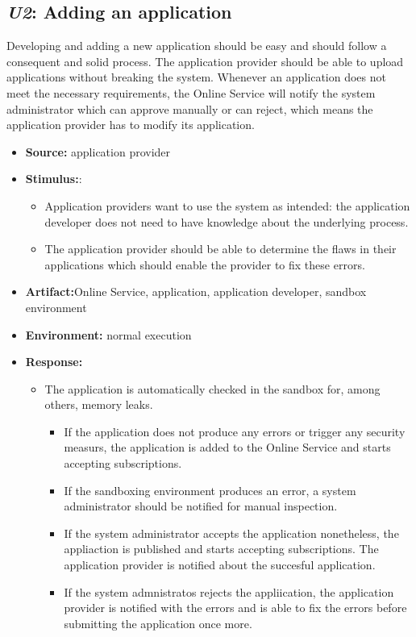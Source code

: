 \documentclass[english]{sareport}
\begin{document}
\subsection{\emph{U2}: Adding an application}
Developing and adding a new application should be easy and should follow a consequent and solid process. The application provider should be able to upload applications without breaking the system. Whenever an application does not meet the necessary requirements, the Online Service will notify the system administrator which can approve manually or can reject, which means the application provider has to modify its application.

\begin{itemize}
    \item \textbf{Source:} application provider
    \item \textbf{Stimulus:}: 
    \begin{itemize}
    \item Application providers want to use the system as intended: the application developer does not need to have knowledge about the underlying process.
    \item The application provider should be able to determine the flaws in their applications which should enable the provider to fix these errors.
    \end{itemize}
    \item \textbf{Artifact:}Online Service, application, application developer, sandbox environment
    \item \textbf{Environment:} normal execution
    \item \textbf{Response:}
        \begin{itemize}
            \item The application is automatically checked in the sandbox for, among others, memory leaks.
            \begin{itemize} 
            \item If the application does not produce any errors or trigger any security measurs, the application is added to the Online Service and starts accepting subscriptions.
            \item If the sandboxing environment produces an error, a system administrator should be notified for manual inspection.
            \item If the system administrator accepts the application nonetheless, the appliaction is published and starts accepting subscriptions. The application provider is notified about the succesful application.
            \item If the system admnistratos rejects the appliication, the application provider is notified with the errors and is able to fix the errors before submitting the application once more.
            \end{itemize}
        \end{itemize}


\end{itemize}
\end{document}
